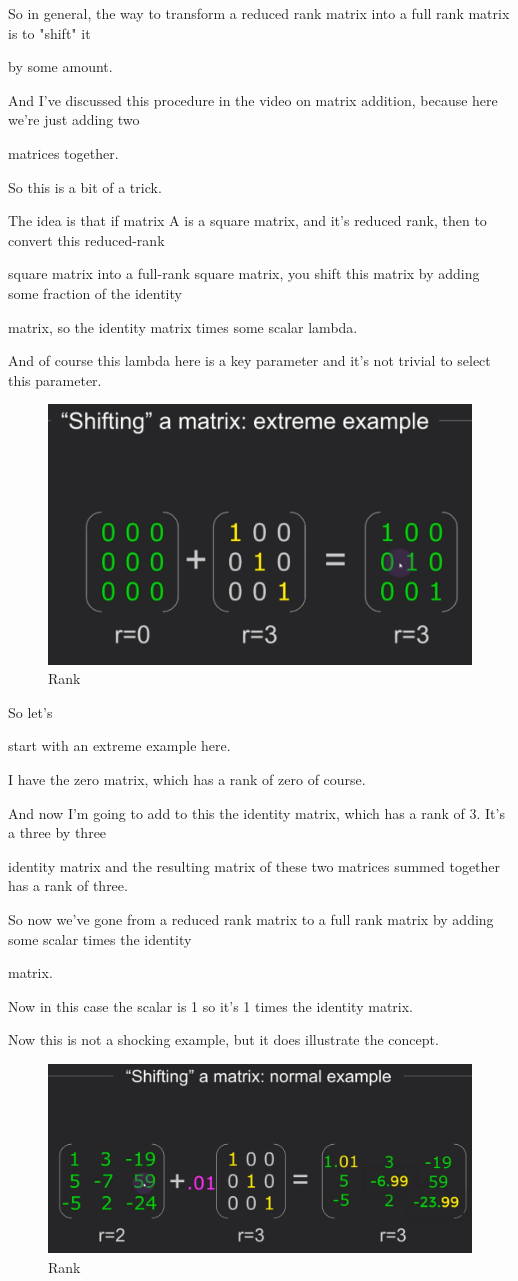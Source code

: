 \documentclass[fleqn,10pt]{olplainarticle}
\theoremstyle{definition}
\theoremstyle{remark}
\begin{document}
So in general, the way to transform a reduced rank matrix into a full rank matrix is to "shift" it

by some amount.

And I've discussed this procedure in the video on matrix addition, because here we're just adding two

matrices together.

So this is a bit of a trick.

The idea is that if matrix A is a square matrix, and it's reduced rank, then to convert this reduced-rank

square matrix into a full-rank square matrix, you shift this matrix by adding some fraction of the identity

matrix, so the identity matrix times some scalar lambda.

And of course this lambda here is a key parameter and it's not trivial to select this parameter. 

\begin{figure}[ht]
	\centering
	\includegraphics[width=0.3\linewidth]{images/rank-30.png}
	\caption{Rank}
	\label{fig:rank_30}
\end{figure}

So let's

start with an extreme example here.

I have the zero matrix, which has a rank of zero of course.

And now I'm going to add to this the identity matrix, which has a rank of 3. It's a three by three

identity matrix and the resulting matrix of these two matrices summed together has a rank of three.

So now we've gone from a reduced rank matrix to a full rank matrix by adding some scalar times the identity

matrix.

Now in this case the scalar is 1 so it's 1 times the identity matrix.

Now this is not a shocking example, but it does illustrate the concept.

\begin{figure}[ht]
	\centering
	\includegraphics[width=0.5\linewidth]{images/rank-31.png}
	\caption{Rank}
	\label{fig:rank_31}
\end{figure}
\end{document}
